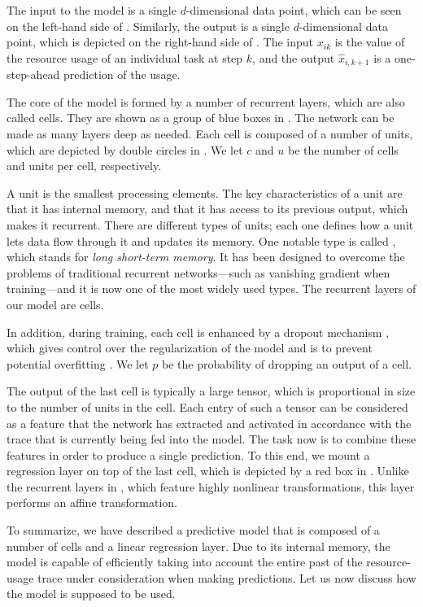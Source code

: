 The input to the model is a single $d$-dimensional data point, which can be seen
on the left-hand side of . Similarly, the output is a single
$d$-dimensional data point, which is depicted on the right-hand side of
. The input $x_{ik}$ is the value of the resource usage of an
individual task at step $k$, and the output $\hat{x}_{i,k + 1}$ is a
one-step-ahead prediction of the usage.

The core of the model is formed by a number of recurrent layers, which are also
called cells. They are shown as a group of blue boxes in . The
network can be made as many layers deep as needed. Each cell is composed of a
number of units, which are depicted by double circles in . We let
$c$ and $u$ be the number of cells and units per cell, respectively.

A unit is the smallest processing elements. The key characteristics of a unit
are that it has internal memory, and that it has access to its previous output,
which makes it recurrent. There are different types of units; each one defines
how a unit lets data flow through it and updates its memory. One notable type is
called  \cite{hochreiter1997}, which stands for \emph{long short-term
memory}. It has been designed to overcome the problems of traditional recurrent
networks---such as vanishing gradient when training---and it is now one of the
most widely used types. The recurrent layers of our model are  cells.

In addition, during training, each cell is enhanced by a dropout mechanism
\cite{zaremba2014}, which gives control over the regularization of the model and
is to prevent potential overfitting \cite{hastie2013}. We let $p$ be the
probability of dropping an output of a cell.

The output of the last cell is typically a large tensor, which is proportional
in size to the number of units in the cell. Each entry of such a tensor can be
considered as a feature that the network has extracted and activated in
accordance with the trace that is currently being fed into the model. The task
now is to combine these features in order to produce a single prediction. To
this end, we mount a regression layer on top of the last cell, which is depicted
by a red box in . Unlike the recurrent layers in ,
which feature highly nonlinear transformations, this layer performs an affine
transformation.

To summarize, we have described a predictive model that is composed of a number
of  cells and a linear regression layer. Due to its internal memory,
the model is capable of efficiently taking into account the entire past of the
resource-usage trace under consideration when making predictions. Let us now
discuss how the model is supposed to be used.
